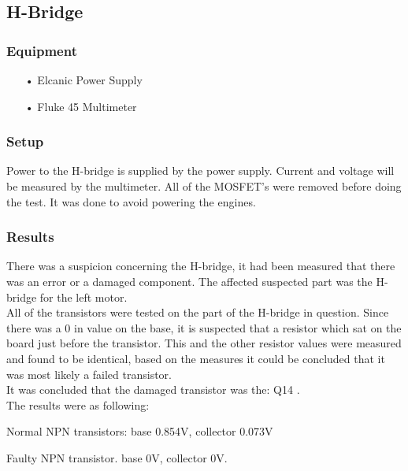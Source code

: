 \subsection{H-Bridge} 

\subsubsection{Equipment}
\begin{enumerate}
	\item[•]Elcanic Power Supply
	\item[•]Fluke 45 Multimeter
\end{enumerate}

\subsubsection{Setup}
Power to the H-bridge is supplied by the power supply. Current and voltage will be measured by the multimeter.
All of the MOSFET's were removed before doing the test. It was done to avoid powering the engines.


\subsubsection{Results}
There was a suspicion concerning the H-bridge, it had been measured that there was an error or a damaged component. The affected suspected part was the H-bridge for the left motor.\\

All of the transistors were tested on the part of the H-bridge in question.
Since there was a 0 in value on the base, it is suspected that a resistor which sat on the board just before the transistor. This and the other resistor values were measured and found to be identical, based on the measures it could be concluded that it was most likely a failed transistor.\\

It was concluded that the damaged transistor was the: Q14 \cite{Q14}  
.\\

The results were as following:\

Normal NPN transistors: base 0.854V, collector 0.073V\

Faulty NPN transistor. base 0V, collector 0V.\\